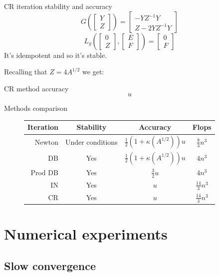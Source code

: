 \documentclass{beamer}
\theoremstyle{plain}
\theoremstyle{definition}
\theoremstyle{remark}
\newcommand{\pa}[1]{\left(#1\right)}
\newcommand{\bra}[1]{\left[#1\right]}
\begin{document}
\begin{frame}{CR iteration stability and accuracy}
  \[ G\pa{\bra{\begin{matrix}Y\\Z\end{matrix}}} = \bra{
      \begin{matrix}
        -YZ^{-1}Y  \\
        Z-2YZ^{-1}Y
      \end{matrix}} \]
  \[ L_g\pa{ \bra{ \begin{matrix}0\\Z\end{matrix}},
      \bra{\begin{matrix}E\\F\end{matrix}}} = \bra{\begin{matrix}0\\
        F \end{matrix}} \]
  It's idempotent and so it's stable. \vfill
  
  Recalling that $Z = 4A^{1/2}$ we get:
  \begin{block}{CR method accuracy}
    \[ u \]
  \end{block}
\end{frame}

\begin{frame}{Methods comparison}
  \begin{figure}
    \begin{tabular}{ r | c c >{\small}c }
      Iteration & Stability & Accuracy & Flops \\
      \hline
      Newton & Under conditions & $\frac{1}{2}\pa{1+ \kappa\pa{A^{1/2}}}u$ & $\frac{8}{3}n^3$ \\
      DB & Yes & $\frac{1}{2}\pa{1+ \kappa\pa{A^{1/2}}}u$ & $4n^3$ \\
      Prod DB & Yes & $\frac{3}{2}u$ & $4n^3$ \\
      IN & Yes & $u$ & $\frac{14}{3}n^3$ \\
      CR & Yes & $u$ & $\frac{14}{3}n^3$
    \end{tabular}
  \end{figure}
\end{frame}

\section{Numerical experiments}

\subsection{Slow convergence}
\end{document}
